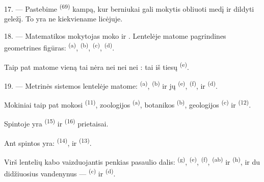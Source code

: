 17. --- Pastebime  \textsuperscript{(69)} 
kampą, kur berniukai gali mokytis obliuoti medį ir dildyti geležį. To yra ne
kiekviename licėjuje.

\VUsaut{5.0mm}
\VUsaut{3.6mm}

18. --- Matematikos mokytojas moko   ir . Lentelėje matome pagrindines
geometrines figūras:  \textsuperscript{(a)}, 
\textsuperscript{(b)},  \textsuperscript{(c)}, 
\textsuperscript{(d)}.

Taip pat matome vieną  tai nėra nei  nei
 nei : tai iš tiesų 
\textsuperscript{(e)}.

19. --- Metrinės sistemos lentelėje matome:  \textsuperscript{(a)},
 \textsuperscript{(b)} ir jų  
\textsuperscript{(e)},  \textsuperscript{(f)},  ir
 \textsuperscript{(d)}.

Mokiniai taip pat mokosi  \textsuperscript{(11)}, zoologijos
\textsuperscript{(a)}, botanikos \textsuperscript{(b)}, geologijos
\textsuperscript{(c)} ir  \textsuperscript{(12)}.

Spintoje yra  \textsuperscript{(15)} ir 
\textsuperscript{(16)} prietaisai.

Ant spintos yra:  \textsuperscript{(14)},  ir
 \textsuperscript{(13)}.

Virš lentelių kabo  vaizduojantis penkias pasaulio dalis:
 \textsuperscript{(g)},  \textsuperscript{(e)},
 \textsuperscript{(f)},  \textsuperscript{(ab)} ir
 \textsuperscript{(h)}, ir du didžiuosius vandenynus ---
 \textsuperscript{(c)} ir  \textsuperscript{(d)}.
\VUsaut{6.0mm}
\VUfilet{22mm}
